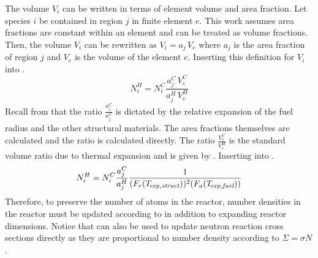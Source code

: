     The volume $V_i$ can be written in terms of element volume and area
    fraction. Let species $i$ be contained in region $j$ in finite element $e$. 
    This work assumes area fractions are constant within an element and can be
    treated as volume fractions. Then, the volume $V_i$ can be rewritten as 
    $V_i = a_j \, V_e$ where $a_j$ is the area fraction of region $j$ and $V_e$
    is the volume of the element $e$. Inserting this definition for $V_i$ into
    .
    \begin{equation}
      \label{eq:nden_expansion_expanded}
      N_i^H = N_i^C \frac{a_j^C \, V_e^C}{a_j^H \, V_e^H}
    \end{equation}
    Recall from  that the
    ratio $\frac{a_j^C}{a_j^C}$ is dictated by the relative expansion of the
    fuel radius and the other structural materials. The area fractions
    themselves are calculated and the ratio is calculated directly. The 
    ratio $\frac{V_e^C}{V_e^H}$ is the standard volume ratio due to thermal 
    expansion and is given by . Inserting 
     into .
    \begin{equation}
      \label{eq:nden_thexp_update}
      N_i^H = N_i^C \frac{a_j^C}{a_j^H} 
        \frac{1}{(F_r(T_{\!\mbox{\scriptsize \em exp,struct}}))^2 (F_a({T_{\!\mbox{\scriptsize \em exp,fuel}}}))}
    \end{equation}
    Therefore, to preserve the number of atoms in the reactor, number densities
    in the reactor must be updated according to  in
    addition to expanding reactor dimensions. Notice that
     can also be used to update neutron reaction
    cross sections directly as they are proportional to number density according
    to $\Sigma = \sigma N$.

